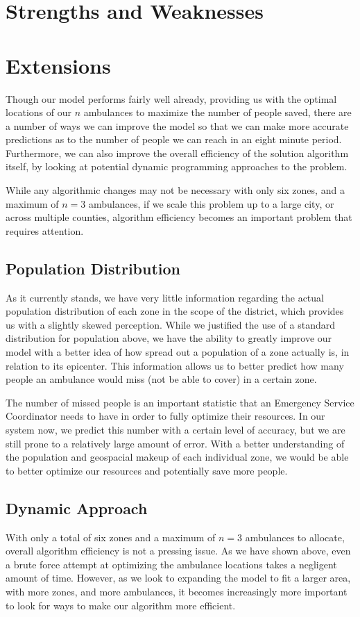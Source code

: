 \documentclass[notitlepage, 12pt]{article}
\begin{document}
\section{Strengths and Weaknesses}

\section{Extensions}
Though our model performs fairly well already, providing us with the optimal locations of our $n$ ambulances to maximize the number of people saved, there are a number of ways we can improve the model so that we can make more accurate predictions as to the number of people we can reach in an eight minute period. Furthermore, we can also improve the overall efficiency of the solution algorithm itself, by looking at potential dynamic programming approaches to the problem. 

While any algorithmic changes may not be necessary with only six zones, and a maximum of $n = 3$ ambulances, if we scale this problem up to a large city, or across multiple counties, algorithm efficiency becomes an important problem that requires attention.

\subsection{Population Distribution}
As it currently stands, we have very little information regarding the actual population distribution of each zone in the scope of the district, which provides us with a slightly skewed perception. While we justified the use of a standard distribution for population above, we have the ability to greatly improve our model with a better idea of how spread out a population of a zone actually is, in relation to its epicenter. This information allows us to better predict how many people an ambulance would miss (not be able to cover) in a certain zone.

The number of missed people is an important statistic that an Emergency Service Coordinator needs to have in order to fully optimize their resources. In our system now, we predict this number with a certain level of accuracy, but we are still prone to a relatively large amount of error. With a better understanding of the population and geospacial makeup of each individual zone, we would be able to better optimize our resources and potentially save more people.

\subsection{Dynamic Approach}
With only a total of six zones and a maximum of $n = 3$ ambulances to allocate, overall algorithm efficiency is not a pressing issue. As we have shown above, even a brute force attempt at optimizing the ambulance locations takes a negligent amount of time. However, as we look to expanding the model to fit a larger area, with more zones, and more ambulances, it becomes increasingly more important to look for ways to make our algorithm more efficient.
\end{document}
